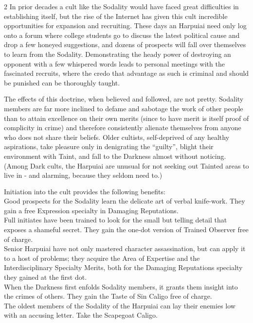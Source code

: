 \begin{multicols}{2}
In prior decades a cult like the Sodality would have faced great difficulties in establishing itself, but the rise of the Internet has given this cult incredible opportunities for expansion and recruiting. These days an Harpuiai need only log onto a forum where college students go to discuss the latest political cause and drop a few honeyed suggestions, and dozens of prospects will fall over themselves to learn from the Sodality. Demonstrating the heady power of destroying an opponent with a few whispered words leads to personal meetings with the fascinated recruits, where the credo that advantage as such is criminal and should be punished can be thoroughly taught.

The effects of this doctrine, when believed and followed, are not pretty. Sodality members are far more inclined to defame and sabotage the work of other people than to attain excellence on their own merits (since to have merit is itself proof of complicity in crime) and therefore consistently alienate themselves from anyone who does not share their beliefs. Older cultists, self-deprived of any healthy aspirations, take pleasure only in denigrating the \textquotedblleft guilty\textquotedblright, blight their environment with Taint, and fall to the Darkness almost without noticing. (Among Dark cults, the Harpuiai are unusual for not seeking out Tainted areas to live in - and alarming, because they seldom need to.)

Initiation into the cult provides the following benefits: \\

\noindent \textbullet Good prospects for the Sodality learn the delicate art of verbal knife-work. They gain a free Expression specialty in Damaging Reputations.\\
\noindent \textbullet\textbullet Full initiates have been trained to look for the small but telling detail that exposes a shameful secret. They gain the one-dot version of Trained Observer free of charge.\\
\noindent \textbullet\textbullet\textbullet Senior Harpuiai have not only mastered character assassination, but can apply it to a host of problems; they acquire the Area of Expertise and the Interdisciplinary Specialty Merits, both for the Damaging Reputations specialty they gained at the first dot.\\
\noindent \textbullet\textbullet\textbullet\textbullet When the Darkness first enfolds Sodality members, it grants them insight into the crimes of others. They gain the Taste of Sin Caligo free of charge.\\
\noindent \textbullet\textbullet\textbullet\textbullet\textbullet The oldest members of the Sodality of the Harpuiai can lay their enemies low with an accusing letter. Take the Scapegoat Caligo.



\end{multicols}

